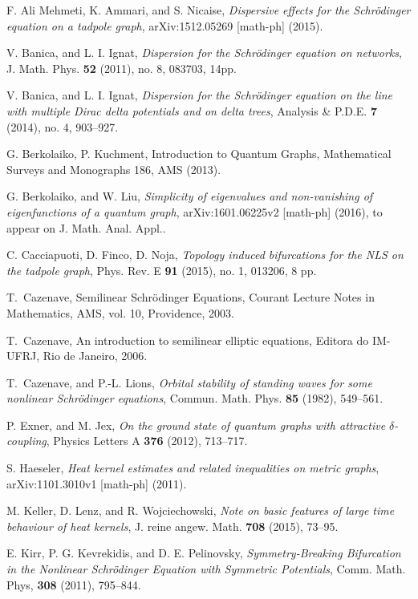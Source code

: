 \documentclass[11pt,a4paper]{amsart}
\theoremstyle{definition}
\numberwithin{equation}{section}
\begin{document}
\begin{thebibliography}{99}
{ F. Ali Mehmeti, K. Ammari, and S. Nicaise, \emph{Dispersive effects for the Schr\"odinger equation on a tadpole graph}, arXiv:1512.05269 [math-ph] (2015).

\bibitem{[BI1]}V. Banica, and L. I. Ignat, \emph{Dispersion for the Schr\"odinger equation on networks},  J. Math. Phys. \textbf{52} (2011), no. 8, 083703, 14pp.

\bibitem{[BI2]}V. Banica, and  L. I. Ignat, \emph{Dispersion for the Schr\"odinger equation on the line with multiple Dirac delta potentials and on delta trees},  Analysis \& P.D.E. {\bf 7} (2014), no. 4, 903--927. 

 G. Berkolaiko, P. Kuchment, Introduction to Quantum Graphs, Mathematical Surveys and Monographs 186,  AMS (2013).
    
 G. Berkolaiko, and  W. Liu, \emph{Simplicity of eigenvalues and non-vanishing of eigenfunctions of a quantum graph}, arXiv:1601.06225v2 [math-ph] (2016), to appear on J. Math. Anal. Appl.. 

 C. Cacciapuoti, D. Finco, D. Noja, \emph{Topology induced bifurcations for the NLS on the tadpole graph}, Phys. Rev. E
\textbf{91} (2015), no. 1,  013206, 8 pp.

T.~Cazenave, {S}emilinear {S}chr\"{o}dinger {E}quations, Courant Lecture Notes in Mathematics, AMS, vol. 10, Providence, 2003.

T.~Cazenave, An introduction to semilinear elliptic equations, Editora
  do IM-UFRJ, Rio de Janeiro, 2006.

\bibitem{[CL]}
T.~Cazenave, and P.-L. Lions, \emph{Orbital stability of standing waves for some
  nonlinear {S}chr\"odinger equations}, Commun. Math. Phys. \textbf{85} (1982),
  549--561.
  
 P. Exner, and M. Jex, \emph{On the ground state of quantum graphs with attractive $\delta$-coupling}, Physics Letters A \textbf{376} (2012), 713--717.

 S. Haeseler, \emph{Heat kernel estimates and related inequalities on metric graphs}, arXiv:1101.3010v1 [math-ph] (2011).

 M. Keller, D. Lenz, and  R. Wojciechowski, \emph{Note on basic features of large time behaviour of heat kernels}, J. reine angew. Math. \textbf{708} (2015), 73--95.

 E. Kirr, P. G. Kevrekidis, and D. E. Pelinovsky, \emph{Symmetry-Breaking Bifurcation in the Nonlinear Schr\"odinger Equation with Symmetric Potentials}, Comm. Math. Phys, {\bf 308} (2011), 795--844. 

}
\end{thebibliography}
\end{document}
